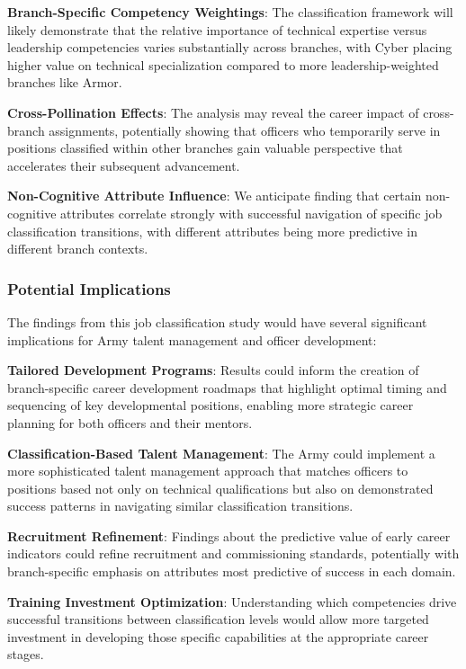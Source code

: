 \documentclass[
  letterpaper,
  DIV=11,
  numbers=noendperiod]{scrartcl}
\begin{document}
\textbf{Branch-Specific Competency Weightings}: The classification
framework will likely demonstrate that the relative importance of
technical expertise versus leadership competencies varies substantially
across branches, with Cyber placing higher value on technical
specialization compared to more leadership-weighted branches like Armor.

\textbf{Cross-Pollination Effects}: The analysis may reveal the career
impact of cross-branch assignments, potentially showing that officers
who temporarily serve in positions classified within other branches gain
valuable perspective that accelerates their subsequent advancement.

\textbf{Non-Cognitive Attribute Influence}: We anticipate finding that
certain non-cognitive attributes correlate strongly with successful
navigation of specific job classification transitions, with different
attributes being more predictive in different branch contexts.

\subsubsection{Potential Implications}\label{potential-implications}

The findings from this job classification study would have several
significant implications for Army talent management and officer
development:

\textbf{Tailored Development Programs}: Results could inform the
creation of branch-specific career development roadmaps that highlight
optimal timing and sequencing of key developmental positions, enabling
more strategic career planning for both officers and their mentors.

\textbf{Classification-Based Talent Management}: The Army could
implement a more sophisticated talent management approach that matches
officers to positions based not only on technical qualifications but
also on demonstrated success patterns in navigating similar
classification transitions.

\textbf{Recruitment Refinement}: Findings about the predictive value of
early career indicators could refine recruitment and commissioning
standards, potentially with branch-specific emphasis on attributes most
predictive of success in each domain.

\textbf{Training Investment Optimization}: Understanding which
competencies drive successful transitions between classification levels
would allow more targeted investment in developing those specific
capabilities at the appropriate career stages.
\end{document}
